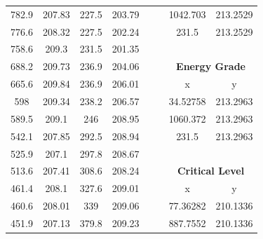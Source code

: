 \begin{center}
\begin{tabular}{|cccc|cc|cc|}
    782.9    & 207.83                  & 227.5  & 203.79                      &        &                             & 1042.703 & 213.2529                           \\
    776.6    & 208.32                  & 227.5  & 202.24                      &        &                             & 231.5    & 213.2529                           \\
    758.6    & 209.3                   & 231.5  & 201.35                      &        &                             &          &                                    \\
    688.2    & 209.73                  & 236.9  & 204.06                      &        &                             & \multicolumn{2}{c|}{\textbf{Energy Grade}}    \\ 
    \cline{7-8}
    665.6    & 209.84                  & 236.9  & 206.01                      &        &                             & x        & y                                  \\
    598      & 209.34                  & 238.2  & 206.57                      &        &                             & 34.52758 & 213.2963                           \\
    589.5    & 209.1                   & 246    & 208.95                      &        &                             & 1060.372 & 213.2963                           \\
    542.1    & 207.85                  & 292.5  & 208.94                      &        &                             & 231.5    & 213.2963                           \\
    525.9    & 207.1                   & 297.8  & 208.67                      &        &                             &          &                                    \\ 
    513.6    & 207.41                  & 308.6  & 208.24                      &        &                             & \multicolumn{2}{c|}{\textbf{Critical Level}}  \\ 
    \cline{7-8}
    461.4    & 208.1                   & 327.6  & 209.01                      &        &                             & x        & y                                  \\
    460.6    & 208.01                  & 339    & 209.06                      &        &                             & 77.36282 & 210.1336                           \\
    451.9    & 207.13                  & 379.8  & 209.23                      &        &                             & 887.7552 & 210.1336                           \\

\end{tabular}
\end{center}
